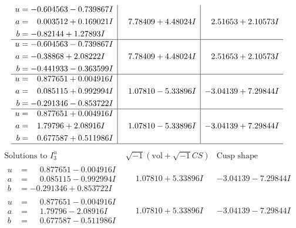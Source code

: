 \documentclass[1p]{elsarticle_modified}
\theoremstyle{definition}
\newcommand{\I}{\sqrt{-1}}
\begin{document}
$$\begin{array}{c|c|c}
\begin{aligned}
u &= -0.604563 - 0.739867 I \\
a &= \phantom{-}0.003512 + 0.169021 I \\
b &= -0.82144 + 1.27893 I\end{aligned}
 & \phantom{-}7.78409 + 4.48024 I & \phantom{-}2.51653 + 2.10573 I \\ \hline\begin{aligned}
u &= -0.604563 - 0.739867 I \\
a &= -0.38868 + 2.08222 I \\
b &= -0.441933 - 0.363599 I\end{aligned}
 & \phantom{-}7.78409 + 4.48024 I & \phantom{-}2.51653 + 2.10573 I \\ \hline\begin{aligned}
u &= \phantom{-}0.877651 + 0.004916 I \\
a &= \phantom{-}0.085115 + 0.992994 I \\
b &= -0.291346 - 0.853722 I\end{aligned}
 & \phantom{-}1.07810 - 5.33896 I & -3.04139 + 7.29844 I \\ \hline\begin{aligned}
u &= \phantom{-}0.877651 + 0.004916 I \\
a &= \phantom{-}1.79796 + 2.08916 I \\
b &= \phantom{-}0.677587 + 0.511986 I\end{aligned}
 & \phantom{-}1.07810 - 5.33896 I & -3.04139 + 7.29844 I\\
 \hline 
 \end{array}$$\newpage$$\begin{array}{c|c|c}  
\text{Solutions to }I^u_{3}& \I (\text{vol} + \sqrt{-1}CS) & \text{Cusp shape}\\
 \hline 
\begin{aligned}
u &= \phantom{-}0.877651 - 0.004916 I \\
a &= \phantom{-}0.085115 - 0.992994 I \\
b &= -0.291346 + 0.853722 I\end{aligned}
 & \phantom{-}1.07810 + 5.33896 I & -3.04139 - 7.29844 I \\ \hline\begin{aligned}
u &= \phantom{-}0.877651 - 0.004916 I \\
a &= \phantom{-}1.79796 - 2.08916 I \\
b &= \phantom{-}0.677587 - 0.511986 I\end{aligned}
 & \phantom{-}1.07810 + 5.33896 I & -3.04139 - 7.29844 I \\ \hline\begin{aligned}

\end{aligned}
\end{array}$$
\end{document}
